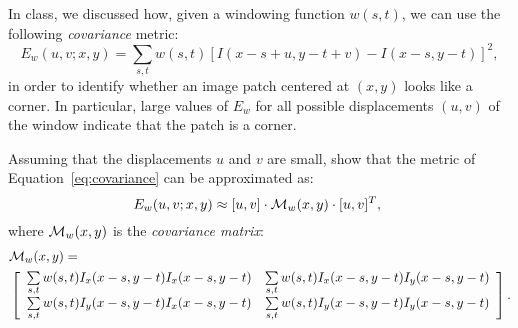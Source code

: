 \begin{problem}
  In class, we discussed how, given a windowing function $w(s,t)$,
  we can use the following \emph{covariance} metric:
\begin{equation}\label{eq:covariance}
  E_w(u,v;x,y) = \sum_{s,t} w(s,t) \left[I(x-s+u,y-t+v) - I(x-s,y-t)\right]^2,
\end{equation}
in order to identify whether an image patch centered at $(x,y)$ looks like a corner.
In particular, large values of $E_w$ for all possible displacements
$(u,v)$ of the window indicate that the patch is a corner.

\step
Assuming that the displacements $u$ and $v$ are small,
show that the metric of Equation~\eqref{eq:covariance} can be approximated as:
\begin{equation}
  E_w(u,v; x, y) \approx [u, v] \cdot {\mathcal{M}}_w(x,y) \cdot [u, v]^T,~\label{eq:approx}
\end{equation}
where ${\mathcal{M}}_w(x,y)$ is the \emph{covariance matrix}:
\begin{align}
&{\mathcal{M}}_w(x,y)=\nonumber\\
&\left[\begin{array}{cc} \sum\limits_{s,t} w(s,t)I_x(x-s,y-t)I_x(x-s,y-t)
& \sum\limits_{s,t} w(s,t)I_x(x-s,y-t)I_y(x-s,y-t)\\
\sum\limits_{s,t} w(s,t)I_y(x-s,y-t)I_x(x-s,y-t) &
\sum\limits_{s,t} w(s,t)I_y(x-s,y-t)I_y(x-s,y-t)
\end{array}\right].
\end{align}
\end{problem}

